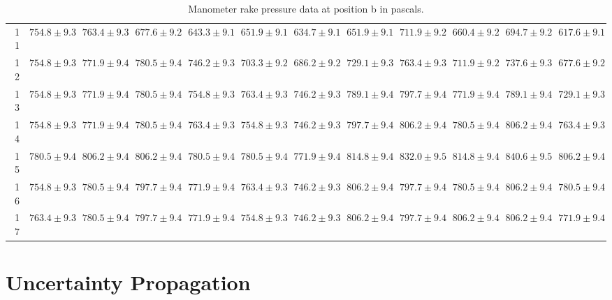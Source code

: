 \documentclass[runningheads]{llncs}
\begin{document}
\begin{table}
\begin{center}
\begin{tabular}{rrrrrrrrrrrr}
11 &  $754.8\pm9.3$ &  $763.4\pm9.3$ &  $677.6\pm9.2$ &  $643.3\pm9.1$ &  $651.9\pm9.1$ &  $634.7\pm9.1$ &  $651.9\pm9.1$ &  $711.9\pm9.2$ &  $660.4\pm9.2$ &  $694.7\pm9.2$ &  $617.6\pm9.1$ \\
12 &  $754.8\pm9.3$ &  $771.9\pm9.4$ &  $780.5\pm9.4$ &  $746.2\pm9.3$ &  $703.3\pm9.2$ &  $686.2\pm9.2$ &  $729.1\pm9.3$ &  $763.4\pm9.3$ &  $711.9\pm9.2$ &  $737.6\pm9.3$ &  $677.6\pm9.2$ \\
13 &  $754.8\pm9.3$ &  $771.9\pm9.4$ &  $780.5\pm9.4$ &  $754.8\pm9.3$ &  $763.4\pm9.3$ &  $746.2\pm9.3$ &  $789.1\pm9.4$ &  $797.7\pm9.4$ &  $771.9\pm9.4$ &  $789.1\pm9.4$ &  $729.1\pm9.3$ \\
14 &  $754.8\pm9.3$ &  $771.9\pm9.4$ &  $780.5\pm9.4$ &  $763.4\pm9.3$ &  $754.8\pm9.3$ &  $746.2\pm9.3$ &  $797.7\pm9.4$ &  $806.2\pm9.4$ &  $780.5\pm9.4$ &  $806.2\pm9.4$ &  $763.4\pm9.3$ \\
15 &  $780.5\pm9.4$ &  $806.2\pm9.4$ &  $806.2\pm9.4$ &  $780.5\pm9.4$ &  $780.5\pm9.4$ &  $771.9\pm9.4$ &  $814.8\pm9.4$ &  $832.0\pm9.5$ &  $814.8\pm9.4$ &  $840.6\pm9.5$ &  $806.2\pm9.4$ \\
16 &  $754.8\pm9.3$ &  $780.5\pm9.4$ &  $797.7\pm9.4$ &  $771.9\pm9.4$ &  $763.4\pm9.3$ &  $746.2\pm9.3$ &  $806.2\pm9.4$ &  $797.7\pm9.4$ &  $780.5\pm9.4$ &  $806.2\pm9.4$ &  $780.5\pm9.4$ \\
17 &  $763.4\pm9.3$ &  $780.5\pm9.4$ &  $797.7\pm9.4$ &  $771.9\pm9.4$ &  $754.8\pm9.3$ &  $746.2\pm9.3$ &  $806.2\pm9.4$ &  $797.7\pm9.4$ &  $806.2\pm9.4$ &  $806.2\pm9.4$ &  $771.9\pm9.4$ \\
\bottomrule
\end{tabular}
\end{center}
\caption{Manometer rake pressure data at position b in pascals.}
\label{tab:pressure_manometer_rake_b}
\end{table}
\newpage
\section{Uncertainty Propagation}
\end{document}
